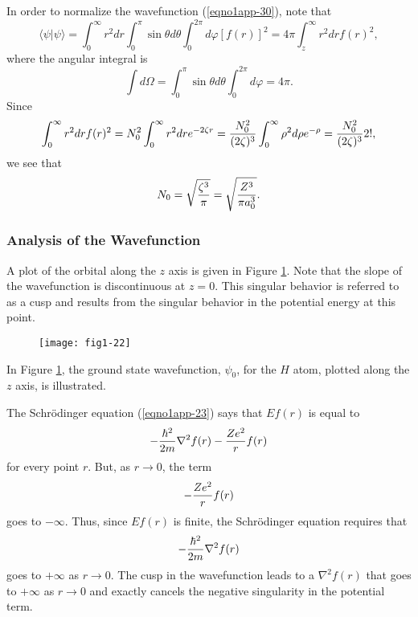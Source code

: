 In order to normalize the wavefunction (\ref{eqno1app-30}), note that
\begin{equation}
\langle \psi \vert \psi \rangle = \int^{\infty}_{0} r^2 dr 
\int^{\pi}_{0} \sin \theta d \theta \int^{2 \pi}_{0} d 
\varphi \left[ f ( r ) \right]^2 = 4 \pi \int^{\infty}_{z} r^2 
drf(r)^2,
\end{equation}
where the angular integral is
\begin{equation}
\int d \Omega = \int^{\pi}_{0} \sin \theta d\theta \int^{2 
\pi}_{0} d\varphi = 4 \pi.
\end{equation}
Since
\begin{equation}
\int^{\infty}_{0} r^2 drf(r)^2 = N_0^2 \int^{\infty}_{0} 
r^2 dre^{-2 \zeta r} = {N_0^2 \over (2 \zeta)^3} 
\int^{\infty}_{0} \rho^2 d \rho e^{- \rho} = {N_0^2 \over (2 
\zeta)^3} 2!,
\end{equation}
we see that
\begin{equation}
N_0 = \sqrt{{\zeta^3 \over \pi}} = \sqrt{{Z^3 \over \pi a^3_0}}.
\end{equation}

\subsubsection{Analysis of the Wavefunction}
    
A plot of the orbital along the $z$ axis is given in Figure
\ref{fig1-22}.  Note that the slope of the wavefunction is
discontinuous at $z = 0$. This singular behavior is referred to as a
cusp and results from the singular behavior in the potential energy at
this point.
\begin{figure}
\texttt{[image: fig1-22]}
\caption{}
\label{fig1-22}
\end{figure}

\noindent
In Figure \ref{fig1-22}, the ground state wavefunction, $\psi_0$, for
the $H$ atom, plotted along the $z$ axis, is illustrated.
    
The Schr\"odinger equation (\ref{eqno1app-23}) says that $Ef (r)$ is equal to
\begin{equation}
- {\hbar^2 \over 2m} \nabla^2 f(r) - {Ze^2 \over r} f(r)
\end{equation}
for every point $r$. But, as $r \rightarrow 0$, the term
\begin{equation}
- {Ze^2 \over r} f(r)
\end{equation}
goes to $- \infty$. Thus, since $Ef (r)$ is finite, the Schr\"odinger 
equation requires that
\begin{equation}
- {\hbar^2 \over 2m} \nabla^2 f(r)
\end{equation}
goes to $+ \infty$ as $r \rightarrow 0$. The cusp in the wavefunction leads 
to a $\nabla^2 f (r)$ that goes to $+ \infty$ as $r \rightarrow 0$
and exactly cancels the negative singularity in the potential term.

